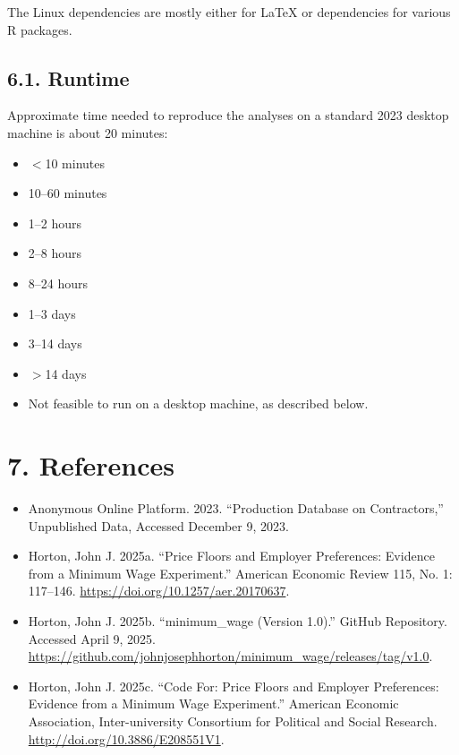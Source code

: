 \documentclass[10pt]{article}
\begin{document}
The Linux dependencies are mostly either for LaTeX or dependencies for various R packages.

\subsection*{6.1. Runtime}

Approximate time needed to reproduce the analyses on a standard 2023 desktop machine is about 20 minutes:
\begin{itemize}[label=]
  \item $<$10 minutes
  \item [\ding{51}] 10--60 minutes
  \item 1--2 hours
  \item 2--8 hours
  \item 8--24 hours
  \item 1--3 days
  \item 3--14 days
  \item $>$14 days
  \item Not feasible to run on a desktop machine, as described below.
\end{itemize}

\vspace{1em}
\section*{7. References}

\begin{itemize}
  \item Anonymous Online Platform. 2023. ``Production Database on Contractors,'' Unpublished Data, Accessed December 9, 2023.
  \item Horton, John J. 2025a. ``Price Floors and Employer Preferences: Evidence from a Minimum Wage Experiment.'' American Economic Review 115, No. 1: 117--146. \href{https://doi.org/10.1257/aer.20170637}{https://doi.org/10.1257/aer.20170637}.
  \item Horton, John J. 2025b. “minimum\_wage (Version 1.0).” GitHub Repository. Accessed April 9, 2025. \\ \href{https://github.com/johnjosephhorton/minimum_wage/releases/tag/v1.0}{https://github.com/johnjosephhorton/minimum\_wage/releases/tag/v1.0}.
  \item Horton, John J. 2025c. ``Code For: Price Floors and Employer Preferences: Evidence from a Minimum Wage Experiment.'' American Economic Association, Inter-university Consortium for Political and Social Research. \\ \href{http://doi.org/10.3886/E208551V1}{http://doi.org/10.3886/E208551V1}.
\end{itemize}
\end{document}
